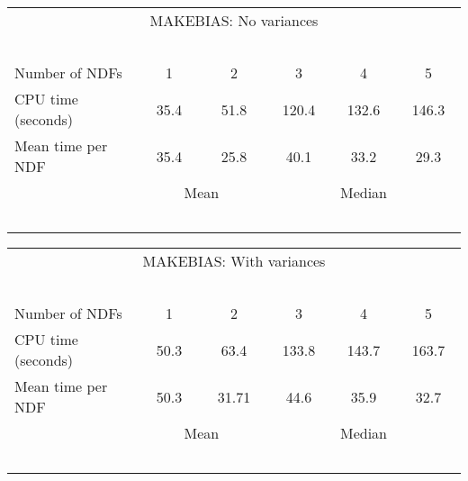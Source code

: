 \begin{center}
   \begin{tabular}{|l||c|c|c|c|c|}
   \multicolumn{6}{c}{MAKEBIAS: No variances} \\
   \multicolumn{6}{l}{~~~}
   \\ \hline
   Number of NDFs    & ~~~1~~~ & ~~~2~~~ & ~~~3~~~ & ~~~4~~~ & ~~~5~~~
    \\ \hline
   CPU time (seconds)&  35.4   & 51.8   & 120.4   &  132.6   & 146.3
    \\ \hline
   Mean time per NDF &  35.4   & 25.8    & 40.1    & 33.2    & 29.3
    \\ \hline
   \multicolumn{1}{c}{~~~}
   & \multicolumn{2}{c|}{Mean}
   & \multicolumn{3}{c}{Median}
   \\
   \multicolumn{6}{l}{~~~}
   \\
   \end{tabular}
   \begin{tabular}{|l||c|c|c|c|c|}
   \multicolumn{6}{c}{MAKEBIAS: With variances} \\
   \multicolumn{6}{l}{~~~}
   \\ \hline
   Number of NDFs    & ~~~1~~~ & ~~~2~~~ & ~~~3~~~ & ~~~4~~~ & ~~~5~~~
    \\ \hline
   CPU time (seconds)&  50.3   & 63.4   & 133.8   & 143.7   & 163.7
    \\ \hline
   Mean time per NDF &  50.3    & 31.71 & 44.6   &  35.9   & 32.7
    \\ \hline
   \multicolumn{1}{c}{~~~}
   & \multicolumn{2}{c|}{Mean}
   & \multicolumn{3}{c}{Median}
   \\
   \multicolumn{6}{l}{~~~}
   \\
   \end{tabular}
\end{center}

